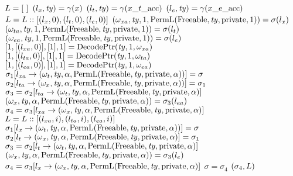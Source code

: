 \begin{algorithm*}\footnotesize
\caption{$(\sigma_4, \locL) \gets \Restore(\x_{\vl}, \gamma, \sigma, \Acc)$}
\label{algo: restore}
\begin{algorithmic}
	\STATE $L = [\ ]$
	\FORALL{$\x \in \x_{\vl}$}	 
		\STATE $(l_x, \mathit{ty}) = \gamma(x)$
		\STATE $(l_t, \mathit{ty}) = \gamma(x\_t\_\mathrm{acc})$
		\STATE $(l_e, \mathit{ty}) = \gamma(x\_e\_\mathrm{acc})$
		\STATE $L = L :: [(l_x, 0), (l_t, 0), (l_e, 0)]$
		\IF{$(\Type = \Priv\ \Const\ \btype*)$}
			\STATE $(\omega_{xa}, \mathit{ty}, 1, \mathrm{PermL}(\mathrm{Freeable}, \mathit{ty}, \mathrm{private}, 1)) = \sigma(l_x)$
			\STATE $(\omega_{ta}, \mathit{ty}, 1, \mathrm{PermL}(\mathrm{Freeable}, \mathit{ty}, \mathrm{private}, 1)) = \sigma(l_t)$
			\STATE $(\omega_{ea}, \mathit{ty}, 1, \mathrm{PermL}(\mathrm{Freeable}, \mathit{ty}, \mathrm{private}, 1)) = \sigma(l_e)$
			\STATE $[1, [(l_{xa}, 0)], [1], 1] = \mathrm{DecodePtr}(\mathit{ty}, 1, \omega_{xa})$
			\STATE $[1, [(l_{ta}, 0)], [1], 1] = \mathrm{DecodePtr}(\mathit{ty}, 1, \omega_{ta})$
			\STATE $[1, [(l_{ea}, 0)], [1], 1] = \mathrm{DecodePtr}(\mathit{ty}, 1, \omega_{ea})$
			\STATE $\sigma_1[l_{xa} \to (\omega_t, \mathit{ty}, \alpha, \mathrm{PermL}(\mathrm{Freeable}, \mathit{ty}, \mathrm{private}, \alpha))] = \sigma$
			\STATE $\sigma_2[l_{ta} \to (\omega_x, \mathit{ty}, \alpha, \mathrm{PermL}(\mathrm{Freeable}, \mathit{ty}, \mathrm{private}, \alpha))] = \sigma_1$
			\STATE $\sigma_3 = \sigma_2[l_{ta} \to (\omega_t, \mathit{ty}, \alpha, \mathrm{PermL}(\mathrm{Freeable}, \mathit{ty}, \mathrm{private}, \alpha)]$
			\STATE $(\omega_x, \mathit{ty}, \alpha, \mathrm{PermL}(\mathrm{Freeable}, \mathit{ty}, \mathrm{private}, \alpha)) = \sigma_3(l_{ea})$
			\STATE $\sigma_4 = \sigma_3[l_{xa} \to (\omega_x, \mathit{ty}, \alpha, \mathrm{PermL}(\mathrm{Freeable}, \mathit{ty}, \mathrm{private}, \alpha)]$
				\STATE $L = L :: [(l_{xa}, i), (l_{ta}, i), (l_{ea}, i)]$
			\ENDFOR
		\ELSE
			\STATE $\sigma_1[l_x \to (\omega_t, \mathit{ty}, \alpha, \mathrm{PermL}(\mathrm{Freeable}, \mathit{ty}, \mathrm{private}, \alpha))] = \sigma$
			\STATE $\sigma_2[l_t \to (\omega_x, \mathit{ty}, \alpha, \mathrm{PermL}(\mathrm{Freeable}, \mathit{ty}, \mathrm{private}, \alpha)] = \sigma_1$
			\STATE $\sigma_3 = \sigma_2[l_t \to (\omega_t, \mathit{ty}, \alpha, \mathrm{PermL}(\mathrm{Freeable}, \mathit{ty}, \mathrm{private}, \alpha)]$
			\STATE $(\omega_x, \mathit{ty}, \alpha, \mathrm{PermL}(\mathrm{Freeable}, \mathit{ty}, \mathrm{private}, \alpha)) = \sigma_3(l_e)$
			\STATE $\sigma_4 = \sigma_3[l_x \to (\omega_x, \mathit{ty}, \alpha, \mathrm{PermL}(\mathrm{Freeable}, \mathit{ty}, \mathrm{private}, \alpha)]$
		\ENDIF
		\STATE $\sigma = \sigma_4$
	\ENDFOR							
	\RETURN $(\sigma_4, L)$
\end{algorithmic}
\end{algorithm*}




